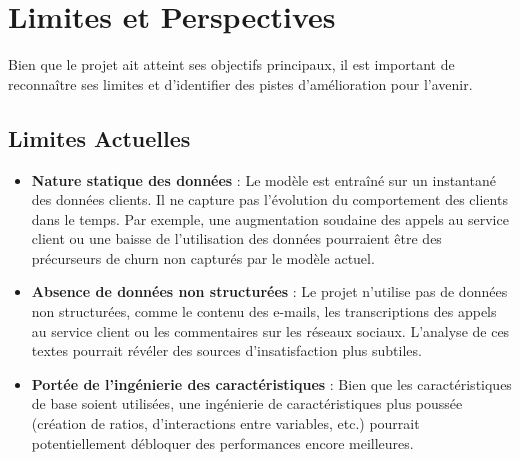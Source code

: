 \section{Limites et Perspectives}
Bien que le projet ait atteint ses objectifs principaux, il est important de reconnaître ses limites et d'identifier des pistes d'amélioration pour l'avenir.

\subsection{Limites Actuelles}
\begin{itemize}
    \item \textbf{Nature statique des données} : Le modèle est entraîné sur un instantané des données clients. Il ne capture pas l'évolution du comportement des clients dans le temps. Par exemple, une augmentation soudaine des appels au service client ou une baisse de l'utilisation des données pourraient être des précurseurs de churn non capturés par le modèle actuel.
    \item \textbf{Absence de données non structurées} : Le projet n'utilise pas de données non structurées, comme le contenu des e-mails, les transcriptions des appels au service client ou les commentaires sur les réseaux sociaux. L'analyse de ces textes pourrait révéler des sources d'insatisfaction plus subtiles.
    \item \textbf{Portée de l'ingénierie des caractéristiques} : Bien que les caractéristiques de base soient utilisées, une ingénierie de caractéristiques plus poussée (création de ratios, d'interactions entre variables, etc.) pourrait potentiellement débloquer des performances encore meilleures.
\end{itemize}

